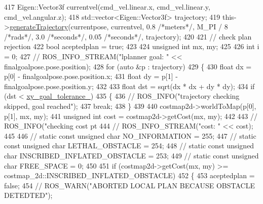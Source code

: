 \begin{DoxyCode}
{417     Eigen::Vector3f currentvel(cmd\_vel.linear.x, cmd\_vel.linear.y, cmd\_vel.angular.z);
418     std::vector<Eigen::Vector3f> trajectory;
419     this->\hyperlink{classcl__move__base__z_1_1forward__local__planner_1_1ForwardLocalPlanner_a3e852f81ccae82c56d7f25e56def899c}{generateTrajectory}(currentpose, currentvel, 0.8 \textcolor{comment}{/*meters*/}, M\_PI / 8 \textcolor{comment}{/*rads*/}, 
      3.0 \textcolor{comment}{/*seconds*/}, 0.05 \textcolor{comment}{/*seconds*/}, trajectory);
420 
421     \textcolor{comment}{// check plan rejection}
422     \textcolor{keywordtype}{bool} aceptedplan = \textcolor{keyword}{true};
423 
424     \textcolor{keywordtype}{unsigned} \textcolor{keywordtype}{int} mx, my;
425 
426     \textcolor{keywordtype}{int} i = 0;
427     \textcolor{comment}{// ROS\_INFO\_STREAM("lplanner goal: " << finalgoalpose.pose.position);}
428     \textcolor{keywordflow}{for} (\textcolor{keyword}{auto} &p : trajectory)
429     \{
430         \textcolor{keywordtype}{float} dx = p[0] - finalgoalpose.pose.position.x;
431         \textcolor{keywordtype}{float} dy = p[1] - finalgoalpose.pose.position.y;
432 
433         \textcolor{keywordtype}{float} dst = sqrt(dx * dx + dy * dy);
434         \textcolor{keywordflow}{if} (dst < \hyperlink{classcl__move__base__z_1_1forward__local__planner_1_1ForwardLocalPlanner_acd2ed91ee166f03faeeb9d6a4b91084b}{xy\_goal\_tolerance\_})
435         \{
436             \textcolor{comment}{//  ROS\_INFO("trajectory checking skipped, goal reached");}
437             \textcolor{keywordflow}{break};
438         \}
439 
440         costmap2d->worldToMap(p[0], p[1], mx, my);
441         \textcolor{keywordtype}{unsigned} \textcolor{keywordtype}{int} cost = costmap2d->getCost(mx, my);
442 
443         \textcolor{comment}{// ROS\_INFO("checking cost pt %
444         \textcolor{comment}{// ROS\_INFO\_STREAM("cost: " << cost);}
445 
446         \textcolor{comment}{// static const unsigned char NO\_INFORMATION = 255;}
447         \textcolor{comment}{// static const unsigned char LETHAL\_OBSTACLE = 254;}
448         \textcolor{comment}{// static const unsigned char INSCRIBED\_INFLATED\_OBSTACLE = 253;}
449         \textcolor{comment}{// static const unsigned char FREE\_SPACE = 0;}
450 
451         \textcolor{keywordflow}{if} (costmap2d->getCost(mx, my) >= costmap\_2d::INSCRIBED\_INFLATED\_OBSTACLE)
452         \{
453             aceptedplan = \textcolor{keyword}{false};
454             \textcolor{comment}{// ROS\_WARN("ABORTED LOCAL PLAN BECAUSE OBSTACLE DETEDTED");}
}}
\end{DoxyCode}
